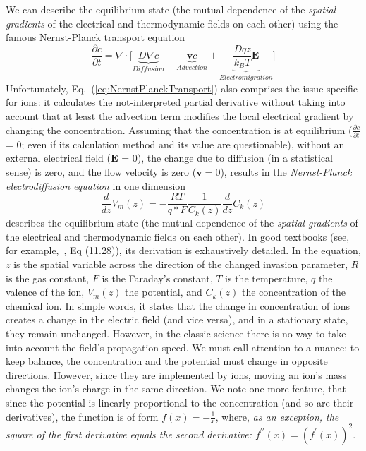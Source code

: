 We can describe the equilibrium
state (the mutual dependence of the \emph{spatial gradients} of the
electrical and thermodynamic fields on each other) using the famous Nernst-Planck transport equation 
%
\begin{equation}
	\frac{\partial c}{\partial t} = \nabla \cdot
	\biggl[ \underbrace{D\nabla c}_{Diffusion} -\underbrace{\mathbf{v}c}_{Advection} + \underbrace{\frac{Dqz}{k_{B}T}\mathbf{E}}_{Electromigration} \biggr] 
	\label{eq:NernstPlanckTransport}	
\end{equation}
Unfortunately,  Eq.~(\ref{eq:NernstPlanckTransport}) also comprises the issue specific for ions: it
calculates the not-interpreted partial derivative without taking into account that at least the advection term modifies the local electrical gradient by changing the concentration.
Assuming that the concentration is at equilibrium ($\frac{\partial c}{\partial t}$ = 0; even if its calculation method and its value are questionable), without an external electrical field ($\mathbf{E}$ = 0),
the change due to diffusion (in a statistical sense) is zero, and the flow velocity is zero ($\mathbf{v}=0$),
results in the
\emph{\hypertarget{NernstPlanckPositionDerivatives}{Nernst-Planck
electrodiffusion equation}} in one dimension
%
%
\begin{equation}
\frac{d}{dz}V_{m}(z)=-\frac{RT}{q*F}\frac{1}{C_{k}(z)}\frac{d}{dz}C_{k}(z)\label{eq:NernstPlanck}
\end{equation}
%
\noindent describes the equilibrium
state (the mutual dependence of the \emph{spatial gradients} of the
electrical and thermodynamic fields on each other).
In good textbooks (see, for example,~\cite{KochBiophysics:1999},
Eq (11.28)), its derivation is exhaustively detailed. In the
equation, $z$ is the spatial variable across the direction of the
changed invasion parameter, $R$ is the gas constant, $F$ is the
Faraday's constant, $T$ is the temperature, $q$ the valence
of the ion, ${V_m(z)}$ the potential, and ${C_k(z)}$ the concentration
of the chemical ion. In simple words, it states that the change in
concentration of ions creates a change in the electric field (and
vice versa), and in a stationary state, they remain unchanged. However,
in the classic science there is no way to take into account the
field's propagation speed.
We must call attention to a nuance: to keep balance, the concentration and the potential must change in opposite directions. However, since they are implemented by ions, moving an ion's
mass changes the ion's charge in the same direction.
We note one more feature, that since the potential is linearly proportional to the concentration (and so are their derivatives), the function is of form $f(x) = - \frac{1}{x}$, where, \textit{as an exception, the square of the first derivative equals the second derivative: $f^{\prime\prime}(x)=(f^{\prime}(x))^2$}.



